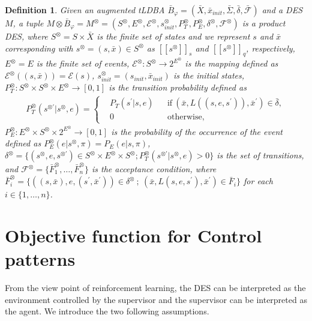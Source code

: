 \documentclass[letterpaper, 10 pt, conference, dvipdfmx]{ieeeconf}
\newtheorem{definition}{Definition}
\newcommand{\mysps}{\ensuremath{[\![s^{\otimes}]\!]}_s}
\newcommand{\myspq}{\ensuremath{[\![s^{\otimes}]\!]}_q}
\begin{document}
\begin{definition}
  Given an augmented tLDBA $\bar{B}_{\varphi} = (\bar{X}, \bar{x}_{init},\bar{\Sigma},\bar{\delta},\bar{\mathcal{F}})$ and a DES $M$, a tuple $M \otimes \bar{B}_{\varphi} = M^{\otimes} = (S^{\otimes}, E^{\otimes}, {\mathcal E}^{\otimes}, s_{init}^{\otimes}, P^{\otimes}_T, P^{\otimes}_E, \delta^{\otimes}, {\mathcal F}^{\otimes})$ is a product DES, where
  $S^{\otimes} = S \times \bar{X}$ is the finite set of states and we represent $s$ and $\bar{x}$ corresponding with $s^{\otimes} = (s,\bar{x}) \in S^{\otimes}$ as $\mysps$ and $\myspq$, respectively, $E^{\otimes}=E$ is the finite set of events, ${\mathcal E}^{\otimes} : S^{\otimes} \rightarrow 2^{E^{\otimes}}$ is the mapping defined as ${\mathcal E}^{\otimes}((s,\bar{x})) = {\mathcal E}(s)$, $s_{init}^{\otimes} = (s_{init},\bar{x}_{init})$ is the initial states, $P^{\otimes}_T : S^{\otimes} \times S^{\otimes} \times E^{\otimes} \rightarrow [0,1]$ is the transition probability defined as
  \begin{align}
    P^{\otimes}_T(s^{\otimes \prime} | s^{\otimes}, e) =
    \left\{
    \begin{aligned}
      &P_T(s^{\prime} | s, e) &   &\text{if}\  (\bar{x}, L((s,e,s^{\prime})), \bar{x}^{\prime}) \in \bar{\delta},\\
      &0 &   &\text{otherwise} ,
    \end{aligned}
    \right. \nonumber
  \end{align}
  $P^{\otimes}_E : E^{\otimes} \times S^{\otimes} \times 2^{E^{\otimes}} \rightarrow [0,1]$ is the probability of the occurrence of the event defined as $P^{\otimes}_E(e | s^{\otimes}, \pi) = P_E(e | s, \pi)$, $\delta^{\otimes} = \{ (s^{\otimes}, e, s^{\otimes \prime}) \in S^{\otimes} \times E^{\otimes} \times S^{\otimes} ; P^{\otimes}_T(s^{\otimes \prime} | s^{\otimes}, e) > 0 \}$ is the set of transitions, and ${\mathcal F}^{\otimes} = \{ \bar{F}^{\otimes}_1, \ldots ,\bar{F}^{\otimes}_n \}$ is the acceptance condition, where $\bar{F}^{\otimes}_i = \{ ((s,\bar{x}), e, (s^{\prime}, \bar{x}^{\prime})) \in \delta^{\otimes}\ ;\ (\bar{x}, L(s,e,s^{\prime}), \bar{x}^{\prime}) \in \bar{F}_i \}$ for each $ i \in \{ 1, \ldots ,n \}$.
\end{definition}

\section{Objective function for Control patterns}
From the view point of reinforcement learning, the DES can be interpreted as the environment controlled by the supervisor and the supervisor can be interpreted as the agent. We introduce the two following assumptions.
\end{document}
